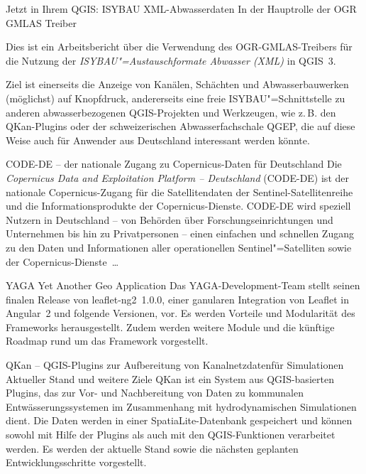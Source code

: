 %
{Jetzt in Ihrem QGIS: ISYBAU XML-Abwasserdaten\vspace{0.2em}}%
{In der Hauptrolle der OGR GMLAS Treiber}%
{%
Dies ist ein Arbeitsbericht über die Verwendung des OGR-GMLAS-Treibers für die Nutzung der
\emph{ISYBAU"=Austauschformate Abwasser (XML)} in QGIS~3.

Ziel ist einerseits die Anzeige von Kanälen,
Schächten und Abwasserbauwerken (möglichst) auf Knopfdruck, andererseits eine freie
ISYBAU"=Schnittstelle zu anderen abwasserbezogenen QGIS-Projekten und Werkzeugen, wie z.\,B. den
QKan-Plugins oder der schweizerischen Abwasserfachschale QGEP, die auf diese Weise auch für Anwender
aus Deutschland interessant werden könnte.%
}
\newpage

%
{CODE-DE -- der nationale Zugang zu Copernicus-Daten für Deutschland}%
{}%
{%
Die \emph{Copernicus Data and Exploitation Platform -- Deutschland} (CODE-DE) ist der nationale
Copernicus-Zugang für die Satellitendaten der Sentinel-Satellitenreihe und die
Informationsprodukte der Copernicus-Dienste. CODE-DE wird speziell Nutzern in Deutschland -- von
Behörden über Forschungseinrichtungen und Unternehmen bis hin zu Privatpersonen -- einen einfachen
und schnellen Zugang zu den Daten und Informationen aller operationellen Sentinel"=Satelliten sowie
der Copernicus-Dienste~\dots %
}




%
{YAGA}%
{Yet Another Geo Application}%
{%
Das YAGA-Development-Team stellt seinen finalen Release von leaflet-ng2~1.0.0, einer ganularen
Integration von Leaflet in Angular~2 und folgende Versionen, vor. Es werden Vorteile und Modularität
des Frameworks herausgestellt. Zudem werden weitere Module und die künftige Roadmap rund um das
Framework vorgestellt.%
}

%
{QKan -- QGIS-Plugins zur \mbox{Aufbereitung} von Kanalnetzdaten\linebreak für \mbox{Simulationen}\vspace{0.2em}}%
{Aktueller Stand und weitere Ziele}%
{%
QKan ist ein System aus QGIS-basierten Plugins, das zur Vor- und Nachbereitung von Daten zu
kommunalen Entwässerungssystemen im Zusammenhang mit hydrodynamischen Simulationen dient. Die Daten
werden in einer SpatiaLite-Datenbank gespeichert und können sowohl mit Hilfe der Plugins als auch
mit den QGIS-Funktionen verarbeitet werden. Es werden der aktuelle Stand sowie die nächsten
geplanten Entwicklungsschritte vorgestellt.%
}

